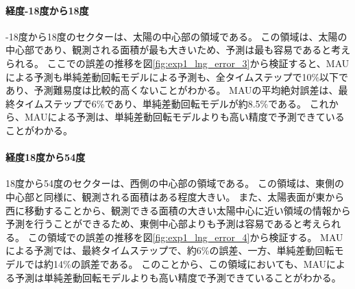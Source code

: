           \paragraph{経度-18度から18度}
          -18度から18度のセクターは、太陽の中心部の領域である。
          この領域は、太陽の中心部であり、観測される面積が最も大きいため、予測は最も容易であると考えられる。
          ここでの誤差の推移を図\ref{fig:exp1_lng_error_3}から検証すると、MAUによる予測も単純差動回転モデルによる予測も、全タイムステップで10\%以下であり、予測難易度は比較的高くないことがわかる。
          MAUの平均絶対誤差は、最終タイムステップで6\%であり、単純差動回転モデルが約8.5\%である。
          これから、MAUによる予測は、単純差動回転モデルよりも高い精度で予測できていることがわかる。
          
          \paragraph{経度18度から54度}
          18度から54度のセクターは、西側の中心部の領域である。
          この領域は、東側の中心部と同様に、観測される面積はある程度大きい。
          また、太陽表面が東から西に移動することから、観測できる面積の大きい太陽中心に近い領域の情報から予測を行うことができるため、東側中心部よりも予測は容易であると考えられる。
          この領域での誤差の推移を図\ref{fig:exp1_lng_error_4}から検証する。
          MAUによる予測では、最終タイムステップで、約6\%の誤差、一方、単純差動回転モデルでは約14\%の誤差である。
          このことから、この領域においても、MAUによる予測は単純差動回転モデルよりも高い精度で予測できていることがわかる。

